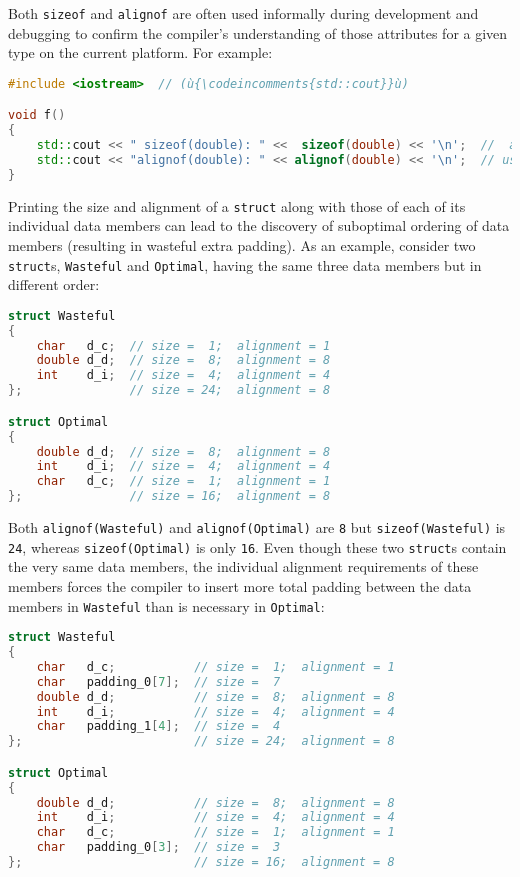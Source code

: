 Both \texttt{sizeof} and \texttt{alignof} are often used informally
during development and debugging to confirm the compiler's understanding
of those attributes for a given type on the current platform. For
example:

\begin{lstlisting}[language=C++]
#include <iostream>  // (ù{\codeincomments{std::cout}}ù)

void f()
{
    std::cout << " sizeof(double): " <<  sizeof(double) << '\n';  //  always 8
    std::cout << "alignof(double): " << alignof(double) << '\n';  // usually 8
}
\end{lstlisting}

\noindent Printing the size and alignment of a \texttt{struct} along with those of
each of its individual data members can lead to the discovery of
suboptimal ordering of data members (resulting in wasteful extra
padding). As an example, consider two \texttt{struct}s,
\texttt{Wasteful} and \texttt{Optimal}, having the same three data members but
in different order:

\begin{lstlisting}[language=C++]
struct Wasteful
{
    char   d_c;  // size =  1;  alignment = 1
    double d_d;  // size =  8;  alignment = 8
    int    d_i;  // size =  4;  alignment = 4
};               // size = 24;  alignment = 8

struct Optimal
{
    double d_d;  // size =  8;  alignment = 8
    int    d_i;  // size =  4;  alignment = 4
    char   d_c;  // size =  1;  alignment = 1
};               // size = 16;  alignment = 8
\end{lstlisting}

\noindent Both \texttt{alignof(Wasteful)} and \texttt{alignof(Optimal)} are
\texttt{8} but \texttt{sizeof(Wasteful)} is \texttt{24}, whereas
\texttt{sizeof(Optimal)} is only \texttt{16}. Even though these two
\texttt{struct}s contain the very same data members, the individual
alignment requirements of these members forces the compiler to insert
more total padding between the data members in \texttt{Wasteful} than is
necessary in \texttt{Optimal}:

\begin{lstlisting}[language=C++]
struct Wasteful
{
    char   d_c;           // size =  1;  alignment = 1
    char   padding_0[7];  // size =  7
    double d_d;           // size =  8;  alignment = 8
    int    d_i;           // size =  4;  alignment = 4
    char   padding_1[4];  // size =  4
};                        // size = 24;  alignment = 8

struct Optimal
{
    double d_d;           // size =  8;  alignment = 8
    int    d_i;           // size =  4;  alignment = 4
    char   d_c;           // size =  1;  alignment = 1
    char   padding_0[3];  // size =  3
};                        // size = 16;  alignment = 8
\end{lstlisting}


